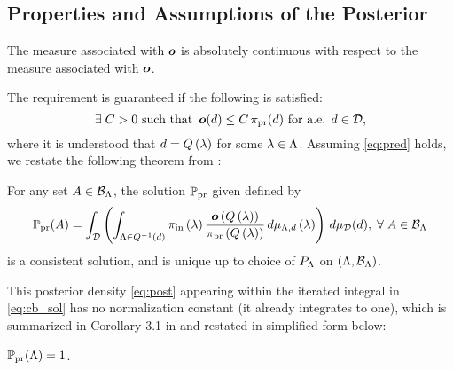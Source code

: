 \subsection{Properties and Assumptions of the Posterior}
\begin{frame}[t]
\begin{assumption}\label{as:pred}
The measure associated with $\operatorname*{\boldsymbol{o}}$ is absolutely continuous with respect to the measure associated with $\operatorname*{\boldsymbol{o}}$.
\end{assumption}


The requirement is guaranteed if the following is satisfied:
\begin{equation}\label{eq:pred}
\exists \; C>0 \text{ such that } \operatorname*{\boldsymbol{o}} (d) \leq C \operatorname*{\pi_{pr}}(d) \text{ for a.e. } d\in \mathcal{D},
\end{equation}
where it is understood that $d = Q\left ( \lambda \right )$ for some $\lambda \in {\Lambda}$.
Assuming \eqref{eq:pred} holds, we restate the following theorem from \cite{BJW18}:
\begin{theorem}
For any set $A\in \mathcal{B}_{{\Lambda}}$, the solution $\operatorname*{\mathbb{P}_{pr}}$ given defined by
\begin{equation}\label{eq:cb_sol}
\operatorname*{\mathbb{P}_{pr}} (A) = \int_{\mathcal{D}} \left (  \int_{{\Lambda} \in Q^{-1}(d)}  \operatorname*{\pi_{in}}\left ( \lambda \right ) \frac{\operatorname*{\boldsymbol{o}}\left ( Q\left ( \lambda \right ) \right )}{\operatorname*{\pi_{pr}}\left ( Q\left ( \lambda \right ) \right )} \, d\mu_{{\Lambda}, d} \left ( \lambda \right ) \right ) \, d\mu_{\mathcal{D}}(d), \; \forall \; A \in \mathcal{B}_{{\Lambda}}
\end{equation}
is a consistent solution, and is unique up to choice of $P_{\Lambda}$ on $({\Lambda}, \mathcal{B}_{{\Lambda}})$.
\end{theorem}

\end{frame}

\begin{frame}[t]

This posterior density \eqref{eq:post} appearing within the iterated integral in \eqref{eq:cb_sol} has no normalization constant (it already integrates to one), which is summarized in Corollary 3.1 in \cite{BJW18} and restated in simplified form below:
\begin{corollary}\label{cor:int}
$\operatorname*{\mathbb{P}_{pr}}({\Lambda}) = 1$.
\end{corollary}

\end{frame}




